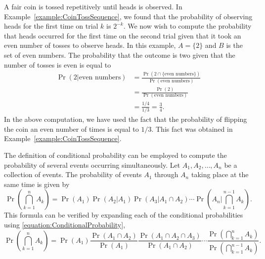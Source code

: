 \begin{example}
A fair coin is tossed repetitively until heads is observed.
In Example~\ref{example:CoinTossSequence}, we found that the probability of observing heads for the first time on trial $k$ is $2^{-k}$.
We now wish to compute the probability that heads occurred for the first time on the second trial given that it took an even number of tosses to observe heads.
In this example, $A = \{ 2 \}$ and $B$ is the set of even numbers.
The probability that the outcome is two given that the number of tosses is even is equal to
\begin{equation*}
\begin{split}
\Pr ( 2 | \text{even numbers} )
&= \frac{\Pr ( 2 \cap \{ \text{even numbers} \} )}
{\Pr (\text{even numbers})} \\
&= \frac{\Pr (2)}{\Pr (\text{even numbers})} \\
&= \frac{1/4}{1/3}
= \frac{3}{4} .
\end{split}
\end{equation*}
In the above computation, we have used the fact that the probability of flipping the coin an even number of times is equal to $1/3$.
This fact was obtained in Example~\ref{example:CoinTossSequence}.
\end{example}

The definition of conditional probability can be employed to compute the probability of several events occurring simultaneously.
Let $A_1, A_2, \ldots, A_n$ be a collection of events.
The probability of events $A_1$ through $A_n$ taking place at the same time is given by
\begin{equation} \label{equation:SimultaneousEvents}
\Pr \left( \bigcap_{k=1}^n A_k \right)
= \Pr (A_1) \Pr (A_2 | A_1) \Pr (A_3 | A_1 \cap A_2)
\cdots \Pr \left( A_n \bigg| \bigcap_{k=1}^{n-1} A_k \right) .
\end{equation}
This formula can be verified by expanding each of the conditional probabilities using \eqref{equation:ConditionalProbability},
\begin{equation*}
\Pr \left( \bigcap_{k=1}^n A_k \right)
= \Pr (A_1) \frac{\Pr (A_1 \cap A_2)}{\Pr (A_1)}
\frac{\Pr (A_1 \cap A_2 \cap A_3)}{\Pr (A_1 \cap A_2)}
\cdots \frac{\Pr \left( \bigcap_{k=1}^{n} A_k \right)}
{\Pr \left( \bigcap_{k=1}^{n-1} A_k \right)} .
\end{equation*}

